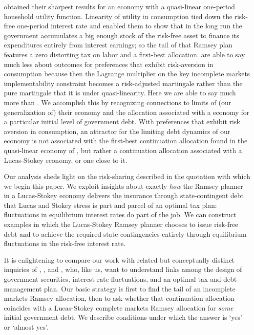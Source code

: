\documentclass[12pt]{article}
\begin{document}
\citeauthor{Aiyagari2002} obtained their sharpest results for an economy with a quasi-linear one-period household  utility function.
 Linearity of utility in consumption tied down the risk-free one-period interest rate and enabled them to show  that in the long run 
 the government accumulates a big enough stock of the risk-free asset  to finance its expenditures entirely from interest earnings; 
 so the tail of that \citeauthor{Aiyagari2002}  Ramsey plan features a zero distorting tax on labor and a first-best allocation.
\citeauthor{Aiyagari2002} are able to say much less about outcomes for  preferences that exhibit risk-aversion in consumption because then the Lagrange multiplier
on the key incomplete markets implementability constraint becomes a risk-adjusted martingale rather than the pure martingale that it is under quasi-linearity. 
Here we are able to say much more  than \citeauthor{Aiyagari2002}. We accomplish this by recognizing connections to limits of (our generalization of)
their economy and the allocation associated with a \citeauthor{LucasJr.1983} economy for a particular initial level of government debt.
With preferences that exhibit risk aversion in consumption, an attractor for the limiting debt dynamics of our economy is not associated with  the first-best
continuation
allocation  found in the quasi-linear economy of \citeauthor{Aiyagari2002}, but rather a continuation allocation associated with a Lucas-Stokey economy,
or one close to it.

Our analysis sheds light on the risk-sharing described in the quotation with which we begin this paper. 
We  exploit insights about exactly {\em how} the Ramsey planner
in a Lucas-Stokey economy delivers the insurance through state-contingent debt that Lucas and Stokey stress is part and parcel of an optimal tax plan:  
fluctuations in
 equilibrium interest rates do part of the job.  We can construct examples in which the Lucas-Stokey Ramsey planner chooses to issue risk-free debt and to
 achieve the required state-contingencies entirely through equilibrium fluctuations in the risk-free  interest rate.

 It is enlightening to compare our work  with related but conceptually distinct  inquiries of \citet{Angeletos}, \citet{Buera_Nicolini}, and \citet{Shin2007},
 who, like us,   want to understand  links among the design of  government securities, interest rate fluctuations,  and an optimal tax and 
debt management plan.  
Our basic strategy is first to find the tail of an   incomplete markets Ramsey allocation, 
then to ask whether that continuation allocation coincides with a Lucas-Stokey complete markets Ramsey allocation for {\em some} initial government debt. 
We describe conditions under which the
answer is `yes' or `almost yes'.
\end{document}
